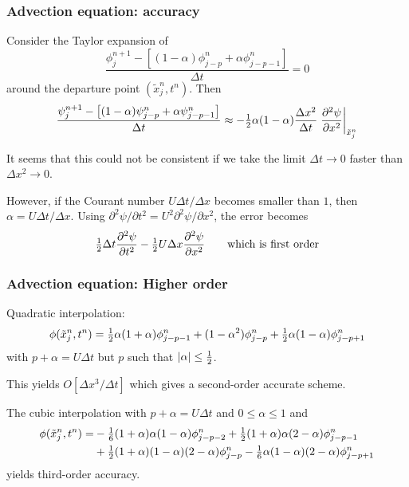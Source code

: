\documentclass[aspectratio=43,9pt]{beamer}
\begin{document}
%
\begin{frame}
	\frametitle{Advection equation: accuracy}
	\begin{myitemize}{2ex}
		\item Consider the Taylor expansion of
			\begin{equation*}
				\frac{ \phi_j^{n+1} - \left[ (1-\alpha) \phi^n_{j-p} + \alpha \phi_{j-p-1}^n \right]} {\Delta t} = 0
			\end{equation*}
			around the departure point $(\tilde x_j^n, t^n)$. Then
			\begin{equation*}
				\frac{ \psi_j^{n+1} - \left[ (1-\alpha) \psi^n_{j-p} + \alpha \psi_{j-p-1}^n\right]}{\Delta t}
					\approx - {\textstyle\frac{1}{2}} \alpha (1-\alpha) \frac{\Delta x^2}{\Delta t} \left. \frac{\partial^2 \psi}{\partial x^2} \right|_{\tilde x_j^n}
			\end{equation*}
		\item It seems that this could not be consistent if we take the limit $\Delta t \rightarrow 0$ faster than $\Delta x^2\rightarrow 0$.
\pause
		\item However, if the Courant number $U \Delta t / \Delta x$ becomes smaller than $1$, then $\alpha = U \Delta t / \Delta x$. Using $\partial^2 \psi / \partial t^2 = U^2 \partial^2 \psi / \partial x^2$, the error becomes
			\begin{equation*}
				{\textstyle\frac{1}{2}} \Delta t \frac{\partial^2 \psi}{\partial t^2} - {\textstyle\frac{1}{2}} U \Delta x \frac{\partial^2 \psi}{\partial x^2} \qquad \text{which is first order}
			\end{equation*}
	\end{myitemize}
\end{frame}
%
%
\begin{frame}
	\frametitle{Advection equation: Higher order}
	\begin{myitemize}{4ex}
		\item Quadratic interpolation:
			\begin{equation*}
				\phi (\tilde x_j^n, t^n) = {\textstyle\frac{1}{2}} \alpha (1+\alpha) \phi_{j-p-1}^n + (1 - \alpha^2) \phi_{j-p}^n + {\textstyle\frac{1}{2}} \alpha (1-\alpha) \phi_{j-p+1}^n
			\end{equation*}
			with $p + \alpha = U \Delta t$ but $p$ such that $| \alpha | \le {\textstyle\frac{1}{2}}$.
			\par\vspace*{2ex}
			This yields $O [ \Delta x^3 / \Delta t]$ which gives a second-order accurate scheme.
		\item The cubic interpolation with $p + \alpha = U \Delta t$ and $0\leq\alpha\leq1$ and
			\begin{align*}
				\phi ( \tilde x_j^n, t^n ) =& - {\textstyle\frac{1}{6}} (1+\alpha)\alpha(1-\alpha) \phi^n_{j-p-2} + {\textstyle\frac{1}{2}} (1+\alpha)\alpha(2-\alpha) \phi_{j-p-1}^n \\
					& + {\textstyle\frac{1}{2}} (1+\alpha)(1-\alpha)(2-\alpha) \phi_{j-p}^n - {\textstyle\frac{1}{6}} \alpha(1-\alpha)(2-\alpha) \phi_{j-p+1}^n
			\end{align*}
			yields third-order accuracy.
	\end{myitemize}
\end{frame}
\end{document}
